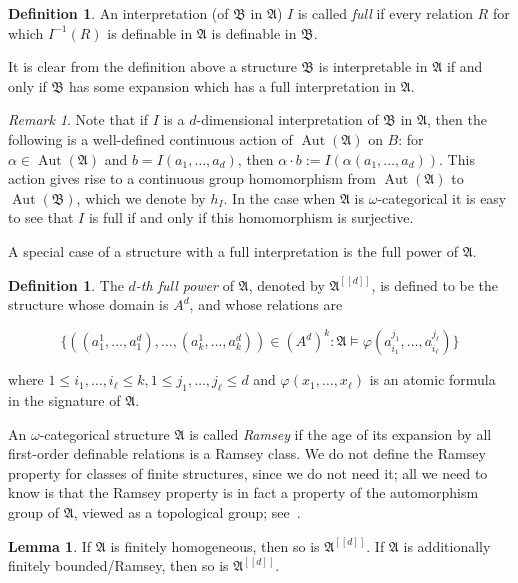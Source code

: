 \documentclass{amsart}
\theoremstyle{definition}
\newtheorem{lemma}[theorem]{Lemma}
\newtheorem{definition}[theorem]{Definition}
\theoremstyle{remark}
\newtheorem{remark}[theorem]{Remark}
\numberwithin{equation}{section}
\newcommand{\aut}{\operatorname{Aut}}
\newcommand{\fa}{\mathfrak{A}}
\newcommand{\fb}{\mathfrak{B}}
\begin{document}
    
	
\begin{definition}
	An interpretation (of $\fb$ in $\fa$) $I$ is called \emph{full} if every relation $R$ for which $I^{-1}(R)$ is definable in $\fa$ is definable in $\fb$. 
\end{definition}

	It is clear from the definition above a structure $\fb$ is interpretable in $\fa$ if and only if $\fb$ has some expansion which has a full interpretation in $\fa$.

    \begin{remark}\label{rem:action}
        Note that if $I$ is a $d$-dimensional interpretation of $\fb$ in $\fa$, then the following is a well-defined continuous action of $\aut(\fa)$ 
    on $B$: for $\alpha \in \aut(\fa)$ and $b = I(a_1,\dots,a_d)$, 
    then $\alpha \cdot b := I(\alpha(a_1,\dots,a_d))$. This action gives rise to a continuous group homomorphism from $\aut(\fa)$ to $\aut(\fb)$, which we denote by $h_I$. 
    In the case when $\fa$ is $\omega$-categorical it is easy to see that $I$ is full if and only if this homomorphism is surjective.
    \end{remark}
    
	
	A special case of a structure with a full interpretation is the full power of $\fa$.
	
\begin{definition}
	The \emph{$d$-th full power} of $\fa$, denoted by $\fa^{[[d]]}$, is defined to be the structure whose domain is $A^d$, and whose relations are

\[
\{((a_1^1,\dots,a_1^d),\dots,(a_k^1,\dots,a_k^d))\in (A^d)^k: \fa\models \varphi(a_{i_1}^{j_1},\dots,a_{i_{\ell}}^{j_{\ell}})\}
\]

	where $1\leq i_1,\dots,i_{\ell}\leq k, 1\leq j_1,\dots,j_{\ell}\leq d$ and $\varphi(x_1,\dots,x_{\ell})$ is an atomic formula in the signature of $\fa$.
\end{definition}

{An $\omega$-categorical structure $\fa$ is called \emph{Ramsey} if the age of 
its expansion by all first-order definable relations is a Ramsey class. We do not define the Ramsey property for classes of finite structures, since we do not need it; all we need to know is that the Ramsey property is in fact a property of the automorphism group of $\fa$, viewed as a topological group; see~\cite{Topo-Dynamics}.} 

\begin{lemma}\label{hom_power}
	If $\fa$ is finitely homogeneous, then so is $\fa^{[[d]]}$. If $\fa$ is additionally finitely bounded/Ramsey, then so is $\fa^{[[d]]}$.
\end{lemma}
\end{document}
